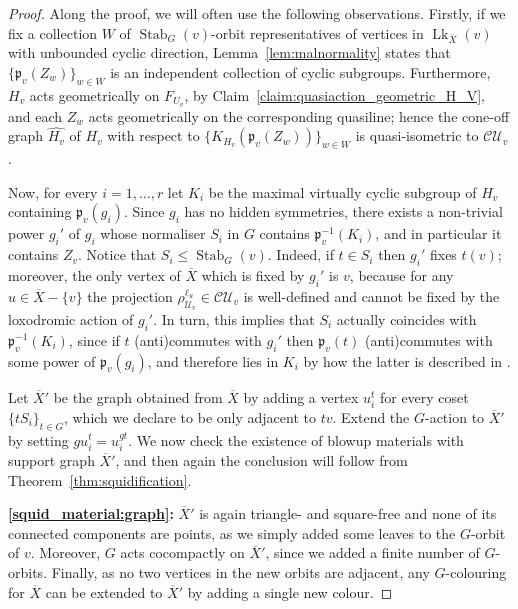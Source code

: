 \documentclass[svgnames]{amsart}
\theoremstyle{plain}
\theoremstyle{definition}
\newcommand{\C}{\mathcal C}
\newcommand{\ov}[1]{\overline{#1}}
\newcommand{\U}{\mathcal{U}}
\newcommand{\link}{\operatorname{Lk}}
\newcommand{\Stab}[2]{\operatorname{Stab}_{#1}(#2)}
\newcommand{\p}{\mathfrak{p}}
\newcommand{\h}{\widehat}
\begin{document}
\begin{proof}
Along the proof, we will often use the following observations. Firstly, if we fix a collection $W$ of $\Stab{G}{v}$-orbit representatives of vertices in $\link_{\ov X}(v)$ with unbounded cyclic direction, Lemma~\ref{lem:malnormality} states that $\{\p_v(Z_{w})\}_{w\in W}$ is an independent collection of cyclic subgroups. Furthermore, $H_v$ acts geometrically on $F_{U_v}$, by Claim~\ref{claim:quasiaction_geometric_H_V}, and each $Z_w$ acts geometrically on the corresponding quasiline; hence the cone-off graph $\h{H_v}$ of $H_v$ with respect to $\{K_{H_v}(\p_v(Z_{w}))\}_{w\in W}$ is quasi-isometric to $\C \U_v$.
\par\medskip

Now, for every $i=1,\ldots, r$ let $K_i$ be the maximal virtually cyclic subgroup of $H_v$ containing $\p_v(g_i)$. Since $g_i$ has no hidden symmetries, there exists a non-trivial power $g_i'$ of $g_i$ whose normaliser $S_i$ in $G$ contains $\p_v^{-1}(K_i)$, and in particular it contains $Z_v$. Notice that $S_i\le \Stab{G}{v}$. Indeed, if $t\in S_i$ then $g_i'$ fixes $t(v)$; moreover, the only vertex of $\ov X$ which is fixed by $g_i'$ is $v$, because for any $u\in\ov{X}-\{v\}$ the projection $\rho^{\ell_u}_{\U_v}\in\C\U_v$ is well-defined and cannot be fixed by the loxodromic action of $g_i'$. In turn, this implies that $S_i$ actually coincides with $\p_v^{-1}(K_i)$, since if $t$ (anti)commutes with $g_i'$ then $\p_v(t)$ (anti)commutes with some power of $\p_v(g_i)$, and therefore lies in $K_i$ by how the latter is described in \cite[Corollary 6.6]{DGO}.


Let $\ov X'$ be the graph obtained from $\ov X$ by adding a vertex $u_i^t$ for every coset $\{tS_{i}\}_{t\in G}$, which we declare to be only adjacent to $t v$. Extend the $G$-action to $\ov X'$ by setting $g u_i^t=u_i^{gt}$. We now check the existence of blowup materials with support graph $\ov X'$, and then again the conclusion will follow from Theorem~\ref{thm:squidification}.

\par\medskip
\textbf{\eqref{squid_material:graph}:} $\ov X'$ is again triangle- and square-free and none of its connected components are points, as we simply added some leaves to the $G$-orbit of $v$. Moreover, $G$ acts cocompactly on $\ov X'$, since we added a finite number of $G$-orbits. Finally, as no two vertices in the new orbits are adjacent, any $G$-colouring for $\ov X$ can be extended to $\ov X'$ by adding a single new colour.


\end{proof}
\end{document}

